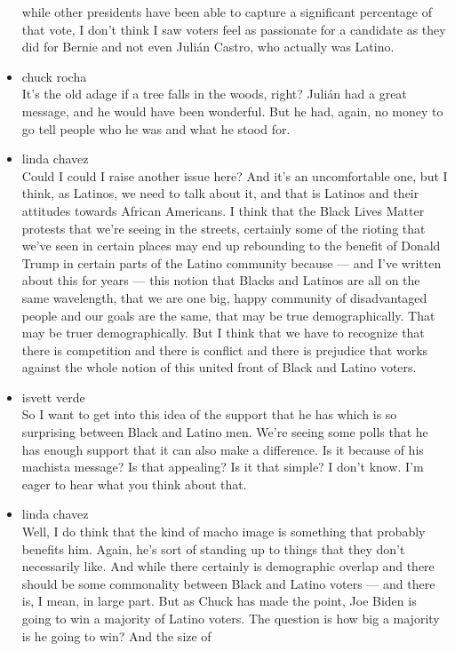 \begin{itemize}
  while other presidents have been able to capture a significant
  percentage of that vote, I don't think I saw voters feel as passionate
  for a candidate as they did for Bernie and not even Julián Castro, who
  actually was Latino.
\item
  chuck rocha\\
  It's the old adage if a tree falls in the woods, right? Julián had a
  great message, and he would have been wonderful. But he had, again, no
  money to go tell people who he was and what he stood for.
\item
  linda chavez\\
  Could I could I raise another issue here? And it's an uncomfortable
  one, but I think, as Latinos, we need to talk about it, and that is
  Latinos and their attitudes towards African Americans. I think that
  the Black Lives Matter protests that we're seeing in the streets,
  certainly some of the rioting that we've seen in certain places may
  end up rebounding to the benefit of Donald Trump in certain parts of
  the Latino community because --- and I've written about this for years
  --- this notion that Blacks and Latinos are all on the same
  wavelength, that we are one big, happy community of disadvantaged
  people and our goals are the same, that may be true demographically.
  That may be truer demographically. But I think that we have to
  recognize that there is competition and there is conflict and there is
  prejudice that works against the whole notion of this united front of
  Black and Latino voters.
\item
  isvett verde\\
  So I want to get into this idea of the support that he has which is so
  surprising between Black and Latino men. We're seeing some polls that
  he has enough support that it can also make a difference. Is it
  because of his machista message? Is that appealing? Is it that simple?
  I don't know. I'm eager to hear what you think about that.
\item
  linda chavez\\
  Well, I do think that the kind of macho image is something that
  probably benefits him. Again, he's sort of standing up to things that
  they don't necessarily like. And while there certainly is demographic
  overlap and there should be some commonality between Black and Latino
  voters --- and there is, I mean, in large part. But as Chuck has made
  the point, Joe Biden is going to win a majority of Latino voters. The
  question is how big a majority is he going to win? And the size of

\end{itemize}
